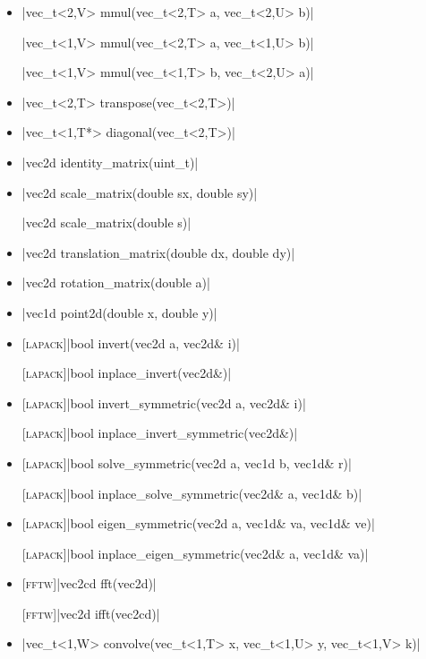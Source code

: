 \documentclass[12pt]{report}
\newcommand{\lapacksym}{\textsc{\small[lapack\small]}}
\newcommand{\lapack}{\lapacksym\hspace{2pt}\xspace}
\newcommand{\fftwsym}{\textsc{[fftw]}}
\newcommand{\fftw}{\fftwsym\hspace{2pt}\xspace}
\begin{document}
\begin{itemize}
\item \cppinline|vec_t<2,V> mmul(vec_t<2,T> a, vec_t<2,U> b)| 

\cppinline|vec_t<1,V> mmul(vec_t<2,T> a, vec_t<1,U> b)|

\cppinline|vec_t<1,V> mmul(vec_t<1,T> b, vec_t<2,U> a)|

\item \cppinline|vec_t<2,T> transpose(vec_t<2,T>)| 

\item \cppinline|vec_t<1,T*> diagonal(vec_t<2,T>)| 

\item \cppinline|vec2d identity_matrix(uint_t)| 

\item \cppinline|vec2d scale_matrix(double sx, double sy)| 

\cppinline|vec2d scale_matrix(double s)|

\item \cppinline|vec2d translation_matrix(double dx, double dy)| 

\item \cppinline|vec2d rotation_matrix(double a)| 

\item \cppinline|vec1d point2d(double x, double y)| 

\item \lapack \cppinline|bool invert(vec2d a, vec2d& i)| 

\lapack \cppinline|bool inplace_invert(vec2d&)| 

\item \lapack \cppinline|bool invert_symmetric(vec2d a, vec2d& i)| 

\lapack \cppinline|bool inplace_invert_symmetric(vec2d&)| 

\item \lapack \cppinline|bool solve_symmetric(vec2d a, vec1d b, vec1d& r)| 

\lapack \cppinline|bool inplace_solve_symmetric(vec2d& a, vec1d& b)| 

\item \lapack \cppinline|bool eigen_symmetric(vec2d a, vec1d& va, vec1d& ve)| 

\lapack \cppinline|bool inplace_eigen_symmetric(vec2d& a, vec1d& va)| 

\item \fftw \cppinline|vec2cd fft(vec2d)| 

\fftw \cppinline|vec2d ifft(vec2cd)| 

\item \cppinline|vec_t<1,W> convolve(vec_t<1,T> x, vec_t<1,U> y, vec_t<1,V> k)| 

\end{itemize}
\end{document}
